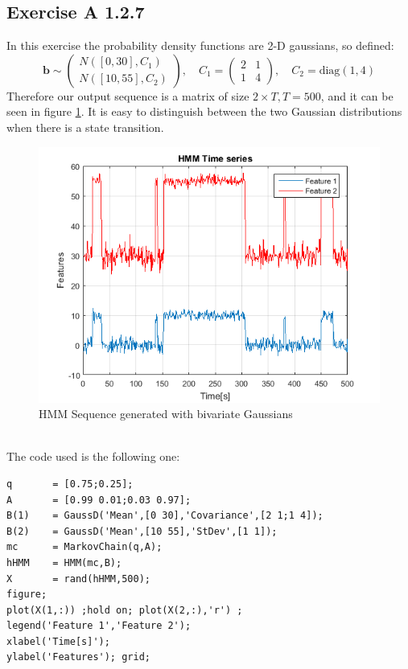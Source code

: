 \documentclass[10pt,a4paper,final]{article}
\begin{document}
\subsection{Exercise A 1.2.7}
In this exercise the probability density functions are 2-D gaussians, so defined: 
 $$\mathbf{b} \sim
 \begin{pmatrix}
  \mathit{N}([0, 30],C_1) \\
  \mathit{N}([10, 55],C_2)
 \end{pmatrix} , \quad
 C_ 1=\begin{pmatrix}
  2 & 1 \\
  1 & 4
 \end{pmatrix}, \quad
 C_2 = \text{diag}(1,4)$$
 Therefore our output sequence is a matrix of size $2 \times T, T=500$, and it can be seen in figure \ref{fig:A6}. It is easy to distinguish between  the two Gaussian distributions when there is a state transition. 
\begin{figure}[h]
		\centering
		\includegraphics[width=0.55\linewidth]{./images/A6.png}
		\caption{HMM Sequence generated with bivariate Gaussians}
		\label{fig:A6}	
\end{figure}\\
The code used is the following one:
\begin{lstlisting}
q       = [0.75;0.25];
A       = [0.99 0.01;0.03 0.97];
B(1)    = GaussD('Mean',[0 30],'Covariance',[2 1;1 4]);
B(2)    = GaussD('Mean',[10 55],'StDev',[1 1]);
mc      = MarkovChain(q,A);
hHMM    = HMM(mc,B);
X       = rand(hHMM,500);
figure;
plot(X(1,:)) ;hold on; plot(X(2,:),'r') ;
legend('Feature 1','Feature 2');
xlabel('Time[s]');
ylabel('Features'); grid;
 \end{lstlisting}
\newpage
\end{document}
